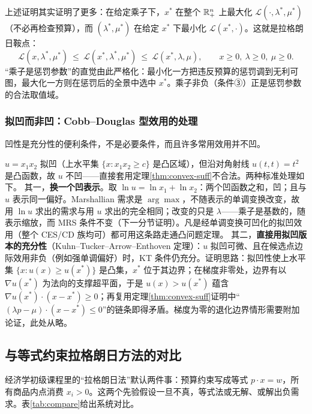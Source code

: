\begin{remark}[鞍点视角]
\label{rem:saddle}
上述证明其实证明了更多：在给定乘子下，$x^*$ 在整个 $\mathbb{R}^n_+$ 上最大化 $\mathcal L(\cdot,\lambda^*,\mu^*)$（不必再检查预算），而 $(\lambda^*,\mu^*)$ 在给定 $x^*$ 下最小化 $\mathcal L(x^*,\cdot)$。这就是拉格朗日鞍点：
\[
 \mathcal L(x,\lambda^*,\mu^*)\ \le\ \mathcal L(x^*,\lambda^*,\mu^*)\ \le\ \mathcal L(x^*,\lambda,\mu),
 \qquad x\ge0,\ \lambda\ge0,\ \mu\ge0.
\]
“乘子是惩罚参数”的直觉由此严格化：最小化一方把违反预算的惩罚调到无利可图，最大化一方则在惩罚后的全景中选中 $x^*$。乘子非负（条件③）正是惩罚参数的合法取值域。
\end{remark}

\subsubsection{拟凹而非凹：Cobb--Douglas 型效用的处理}

凹性是充分性的便利条件，不是必要条件，而且许多常用效用并不凹。

\begin{remark}[拟凹非凹效用的两种处理]
\label{rem:quasi}
$u=x_1x_2$ 拟凹（上水平集 $\{x:x_1x_2\ge c\}$ 是凸区域），但沿对角射线 $u(t,t)=t^2$ 是凸函数，故 $u$ 不凹——直接套用定理\ref{thm:convex-suff}不合法。两种标准处理如下。
其一，\textbf{换一个凹表示}。取 $\ln u=\ln x_1+\ln x_2$：两个凹函数之和，凹；且与 $u$ 表示同一偏好。Marshallian 需求是 $\arg\max$，不随表示的单调变换改变，故用 $\ln u$ 求出的需求与用 $u$ 求出的完全相同；改变的只是 $\lambda$——乘子是基数的，随表示缩放，而 MRS 条件不变（下一分节证明）。凡是经单调变换可凹化的拟凹效用（整个 CES/CD 族均可）都可用这条路走通凸问题定理。
其二，\textbf{直接用拟凹版本的充分性}（Kuhn--Tucker--Arrow--Enthoven 定理）：$u$ 拟凹可微、且在候选点边际效用非负（例如强单调偏好）时，KT 条件仍充分。证明思路：拟凹性使上水平集 $\{x:u(x)\ge u(x^*)\}$ 是凸集，$x^*$ 位于其边界；在梯度非零处，边界有以 $\nabla u(x^*)$ 为法向的支撑超平面，于是 $u(x)>u(x^*)$ 蕴含 $\nabla u(x^*)\cdot(x-x^*)\ge0$；再复用定理\ref{thm:convex-suff}证明中“$(\lambda p-\mu)\cdot(x-x^*)\le0$”的链条即得矛盾。梯度为零的退化边界情形需要附加论证，此处从略。
\end{remark}

\subsection{与等式约束拉格朗日方法的对比}
\label{sec:compare}

经济学初级课程里的“拉格朗日法”默认两件事：预算约束写成等式 $p\cdot x=w$，所有商品内点消费 $x_i>0$。这两个先验假设一旦不真，等式法或无解、或解出负需求。表\ref{tab:compare}给出系统对比。

